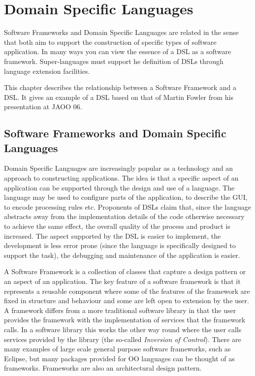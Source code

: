 \chapter{Domain Specific Languages}

Software Frameworks and Domain Specific Languages are related in the sense 
that both aim to support the construction of specific types of software application. 
In many ways you can view the essence of a DSL as a software framework. 
Super-languages must support he definition of DSLs through language extension
facilities.

This chapter describes the relationship between a Software Framework and
a DSL. It gives an example of a DSL based on that of Martin Fowler from 
his presentation at JAOO 06.

\section{Software Frameworks and Domain Specific Languages}

Domain Specific Languages are increasingly popular as a technology 
and an approach to constructing applications. The idea is that a specific 
aspect of an application can be supported through the design and use of a 
language. The language may be used to configure parts of the application, 
to describe the GUI, to encode processing rules etc. Proponents of DSLs 
claim that, since the language abstracts away from the implementation 
details of the code otherwise necessary to achieve the same effect, the 
overall quality of the process and product is increased. The aspect 
supported by the DSL is easier to implement, the development is less 
error prone (since the language is specifically designed to support the task), 
the debugging and maintenance of the application is easier.

A Software Framework is a collection of classes that capture a design 
pattern or an aspect of an application. The key feature of a software 
framework is that it represents a reusable component where some of the 
features of the framework are fixed in structure and behaviour and some 
are left open to extension by the user. A framework differs from a more 
traditional software library in that the user provides the framework with 
the implementation of services that the framework calls. In a software 
library this works the other way round where the user calls services 
provided by the library (the so-called {\em Inversion of Control}). There 
are many examples of large scale general purpose software frameworks, 
such as Eclipse, but many packages provided for OO languages can be 
thought of as frameworks. Frameworks are also an architectural design pattern.

